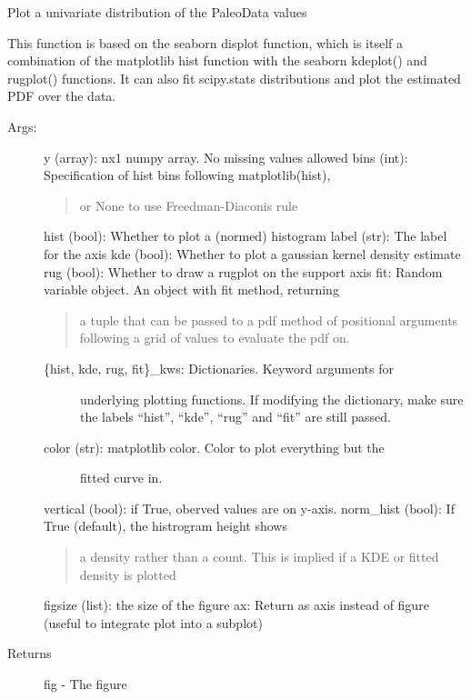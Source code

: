 \documentclass[letterpaper,10pt,english]{sphinxmanual}
\begin{document}
\begin{fulllineitems}
\label{\detokenize{Plot:pyleoclim.Plot.plot_hist}}
Plot a univariate distribution of the PaleoData values

This function is based on the seaborn displot function, which is
itself a combination of the matplotlib hist function with the 
seaborn kdeplot() and rugplot() functions. It can also fit 
scipy.stats distributions and plot the estimated PDF over the data.
\begin{description}
\item[{Args:}] \leavevmode
y (array): nx1 numpy array. No missing values allowed 
bins (int): Specification of hist bins following matplotlib(hist),
\begin{quote}

or None to use Freedman-Diaconis rule
\end{quote}

hist (bool): Whether to plot a (normed) histogram 
label (str): The label for the axis
kde (bool): Whether to plot a gaussian kernel density estimate
rug (bool): Whether to draw a rugplot on the support axis
fit: Random variable object. An object with fit method, returning
\begin{quote}

a tuple that can be passed to a pdf method of positional 
arguments following a grid of values to evaluate the pdf on.
\end{quote}
\begin{description}
\item[{\{hist, kde, rug, fit\}\_kws: Dictionaries. Keyword arguments for }] \leavevmode
underlying plotting functions. If modifying the dictionary, make
sure the labels “hist”, “kde”, “rug” and “fit” are still passed.

\item[{color (str): matplotlib color. Color to plot everything but the}] \leavevmode
fitted curve in.

\end{description}

vertical (bool): if True, oberved values are on y-axis.
norm\_hist (bool): If True (default), the histrogram height shows
\begin{quote}

a density rather than a count. This is implied if a KDE or 
fitted density is plotted
\end{quote}

figsize (list): the size of the figure
ax: Return as axis instead of figure (useful to integrate plot into a subplot)

\item[{Returns}] \leavevmode
fig - The figure

\end{description}

\end{fulllineitems}
\end{document}
